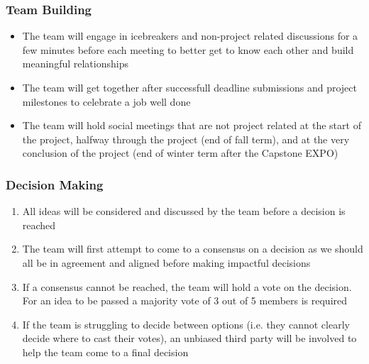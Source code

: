 \documentclass{article}
\begin{document}


\subsubsection*{Team Building}

\begin{itemize}
  \item The team will engage in icebreakers and non-project related discussions for a 
  few minutes before each meeting to better get to know each other and build meaningful 
  relationships
  \item The team will get together after successfull deadline submissions and project 
  milestones to celebrate a job well done
  \item The team will hold social meetings that are not project related at the start of 
  the project, halfway through the project (end of fall term), and at the very conclusion 
  of the project (end of winter term after the Capstone EXPO)
\end{itemize}


\subsubsection*{Decision Making} 

\begin{enumerate}
  \item All ideas will be considered and discussed by the team before a decision is reached
  \item The team will first attempt to come to a consensus on a decision as we 
  should all be in agreement and aligned before making impactful decisions
  \item If a consensus cannot be reached, the team will hold a vote on the decision. For an 
  idea to be passed a majority vote of 3 out of 5 members is required
  \item If the team is struggling to decide between options (i.e. they cannot clearly 
  decide where to cast their votes), an unbiased third party will be involved to 
  help the team come to a final decision
\end{enumerate}

\end{document}
